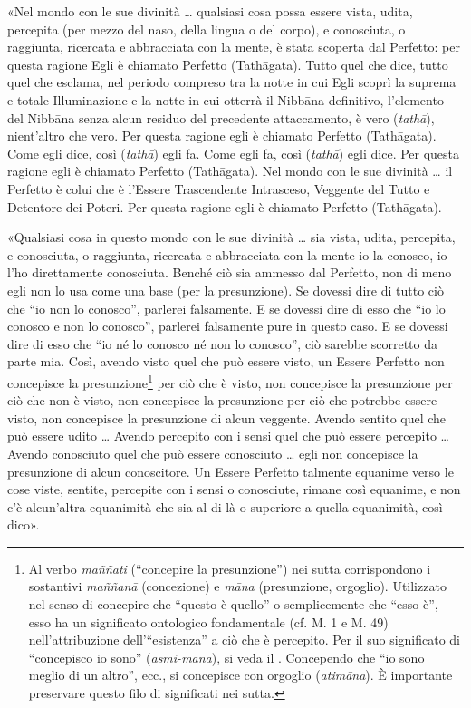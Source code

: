 «Nel mondo con le sue divinità … qualsiasi cosa possa essere vista,
udita, percepita (per mezzo del naso, della lingua o del corpo), e
conosciuta, o raggiunta, ricercata e abbracciata con la mente, è stata
scoperta dal Perfetto: per questa ragione Egli è chiamato Perfetto
(Tathāgata). Tutto quel che dice, tutto quel che esclama, nel periodo
compreso tra la notte in cui Egli scoprì la suprema e totale
Illuminazione e la notte in cui otterrà il Nibbāna definitivo,
l’elemento del Nibbāna senza alcun residuo del precedente attaccamento,
è vero (\emph{tathā}), nient’altro che vero. Per questa ragione egli è
chiamato Perfetto (Tathāgata). Come egli dice, così (\emph{tathā}) egli fa.
Come egli fa, così (\emph{tathā}) egli dice. Per questa ragione egli è
chiamato Perfetto (Tathāgata). Nel mondo con le sue divinità … il
Perfetto è colui che è l’Essere Trascendente Intrasceso, Veggente del
Tutto e Detentore dei Poteri. Per questa ragione egli è chiamato
Perfetto (Tathāgata).




«Qualsiasi cosa in questo mondo con le sue divinità … sia vista, udita,
percepita, e conosciuta, o raggiunta, ricercata e abbracciata con la
mente io la conosco, io l’ho direttamente conosciuta. Benché ciò sia
ammesso dal Perfetto, non di meno egli non lo usa come una base (per la
presunzione). Se dovessi dire di tutto ciò che “io non lo conosco”,
parlerei falsamente. E se dovessi dire di esso che “io lo conosco e non
lo conosco”, parlerei falsamente pure in questo caso. E se dovessi dire
di esso che “io né lo conosco né non lo conosco”, ciò sarebbe scorretto
da parte mia. Così, avendo visto quel che può essere visto, un Essere
Perfetto non concepisce la presunzione\footnote{Al verbo \emph{maññati} (“concepire la presunzione”) nei sutta corrispondono i sostantivi \emph{maññanā} (concezione) e \emph{māna} (presunzione, orgoglio). Utilizzato nel senso di concepire che “questo è quello” o semplicemente che “esso è”, esso ha un significato ontologico fondamentale (cf. M. 1 e M. 49) nell’attribuzione dell’“esistenza” a ciò che è percepito. Per il suo significato di “concepisco io sono” (\emph{asmi-māna}), si veda il \hyperlink{cap-12-La-Dottrina#pag259}{}. Concependo che “io sono meglio di un altro”, ecc., si concepisce con orgoglio (\emph{atimāna}). È importante preservare questo filo di significati nei sutta.}  per ciò che è
visto, non concepisce la presunzione per ciò che non è visto, non
concepisce la presunzione per ciò che potrebbe essere visto, non
concepisce la presunzione di alcun veggente. Avendo sentito quel che può
essere udito … Avendo percepito con i sensi quel che può essere
percepito … Avendo conosciuto quel che può essere conosciuto … egli non
concepisce la presunzione di alcun conoscitore. Un Essere Perfetto
talmente equanime verso le cose viste, sentite, percepite con i sensi o
conosciute, rimane così equanime, e non c’è alcun’altra equanimità che
sia al di là o superiore a quella equanimità, così dico».


